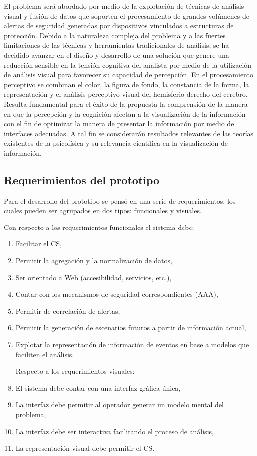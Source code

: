 \documentclass[a4paper]{./plantillas/llncs}
\begin{document}
El problema será abordado por medio de la explotación de técnicas de análisis visual y fusión de datos que soporten el procesamiento de grandes volúmenes de alertas de seguridad generadas por dispositivos vinculados a estructuras de protección. Debido a la naturaleza compleja del problema y a las fuertes limitaciones de las técnicas y herramientas tradicionales de análisis, se ha decidido avanzar en el diseño y desarrollo de una solución que genere una reducción sensible en la tensión cognitiva del analista por medio de la utilización de análisis visual para favorecer su capacidad de  percepción. En el procesamiento perceptivo se combinan el color, la figura de fondo, la constancia de la forma, la representación y el análisis perceptivo visual del hemisferio derecho del cerebro. Resulta fundamental para el éxito de la propuesta la comprensión de la manera en que la percepción y la cognición afectan a la visualización de la información con el fin de optimizar la manera de presentar la información por medio de interfaces adecuadas. A tal fin se considerarán resultados relevantes de las teorías existentes de la psicofísica y su relevancia científica en la visualización de información.

\subsection{Requerimientos del prototipo}

Para el desarrollo del prototipo se pensó en una serie de requerimientos, los cuales pueden ser agrupados en dos tipos: funcionales y visuales.

Con respecto a los requerimientos funcionales el sistema debe:

\begin{enumerate}
\item Facilitar el CS, 
\item Permitir la agregación y la normalización de datos, 
\item Ser orientado a Web (accesibilidad, servicios, etc.), 
\item Contar con los mecanismos de seguridad correspondientes (AAA),
\item Permitir de correlación de alertas,
\item Permitir la generación de escenarios futuros a partir de información actual,
\item Explotar la representación de información de eventos en base a modelos que faciliten el análisis.   \newline

Respecto a los requerimientos visuales: 

\item El sistema debe contar con una interfaz gráfica única, 
\item La interfaz debe permitir al operador generar un modelo mental del problema, 
\item La interfaz debe ser interactiva facilitando el proceso de análisis, 
\item La representación visual debe permitir el CS.
\end{enumerate}
\end{document}
